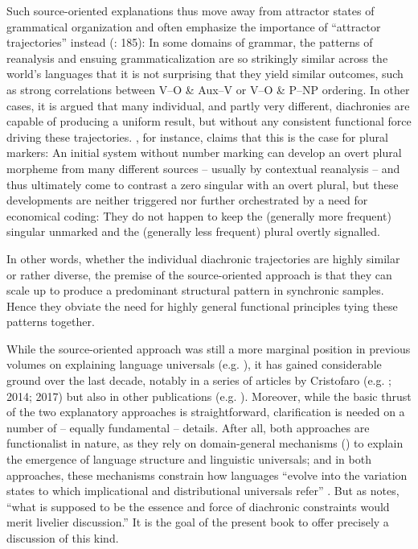 \documentclass[output=paper]{langsci/langscibook}
\begin{document}
Such source-oriented explanations thus move away from attractor states of grammatical organization and often emphasize the importance of “attractor trajectories” instead (\citealt{BybeeBeckner2015}: 185): In some domains of grammar, the patterns of reanalysis and ensuing grammaticalization are so strikingly similar across the world’s languages that it is not surprising that they yield similar outcomes, such as strong correlations between V–O \& Aux–V or V–O \& P–NP ordering. In other cases, it is argued that many individual, and partly very different, diachronies are capable of producing a uniform result, but without any consistent functional force driving these trajectories. \citet{Cristofaro2017}, for instance, claims that this is the case for plural markers: An initial system without number marking can develop an overt plural morpheme from many different sources – usually by contextual reanalysis – and thus ultimately come to contrast a zero singular with an overt plural, but these developments are neither triggered nor further orchestrated by a need for economical coding: They do not happen to keep the (generally more frequent) singular unmarked and the (generally less frequent) plural overtly signalled. 

In other words, whether the individual diachronic trajectories are highly similar or rather diverse, the premise of the source-oriented approach is that they can scale up to produce a predominant structural pattern in synchronic samples. Hence they obviate the need for highly general functional principles tying these patterns together.

While the source-oriented approach was still a more marginal position in previous volumes on explaining language universals (e.g. \citealt{Hawkins1988a,Good2008}), it has gained considerable ground over the last decade, notably in a series of articles by Cristofaro (e.g. \citealt{Cristofaro2012}; 2014; 2017) but also in other publications (e.g. \citealt{Creissels2008,GildeaZúñiga2016}). Moreover, while the basic thrust of the two explanatory approaches is straightforward, clarification is needed on a number of – equally fundamental – details. After all, both approaches are functionalist in nature, as they rely on domain-general mechanisms (\citealt{Bybee2010}) to explain the emergence of language structure and linguistic universals; and in both approaches, these mechanisms constrain how languages “evolve into the variation states to which implicational and distributional universals refer” \citep[18]{Hawkins1988b}. But as \citet[51]{Plank2007} notes, “what is supposed to be the essence and force of diachronic constraints would merit livelier discussion.” It is the goal of the present book to offer precisely a discussion of this kind.
\end{document}
